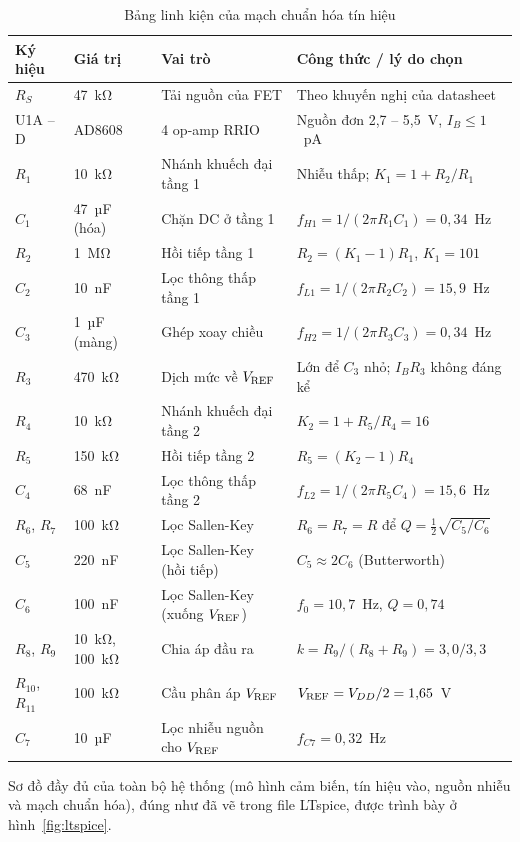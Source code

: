 \begin{table}[!htb]
\centering
\caption{Bảng linh kiện của mạch chuẩn hóa tín hiệu}
\label{tab:bom}
\small
\begin{tabularx}{\textwidth}{@{}p{1.3cm}p{1.7cm}p{3.8cm}L@{}}
\toprule
\textbf{Ký hiệu} & \textbf{Giá trị} & \textbf{Vai trò} & \textbf{Công thức / lý do chọn} \\ \midrule
$R_S$ & 47~kΩ & Tải nguồn của FET & Theo khuyến nghị của datasheet \\
U1A -- D & AD8608 & 4 op-amp RRIO & Nguồn đơn 2,7 -- 5,5~V, $I_B \le 1$~pA \\
$R_1$ & 10~kΩ & Nhánh khuếch đại tầng 1 & Nhiễu thấp; $K_1 = 1+R_2/R_1$ \\
$C_1$ & 47~µF (hóa) & Chặn DC ở tầng 1 & $f_{H1}=1/(2\pi R_1C_1)=0{,}34$~Hz \\
$R_2$ & 1~MΩ & Hồi tiếp tầng 1 & $R_2 = (K_1-1)R_1$, $K_1 = 101$ \\
$C_2$ & 10~nF & Lọc thông thấp tầng 1 & $f_{L1} = 1/(2\pi R_2C_2) = 15{,}9$~Hz \\
$C_3$ & 1~µF (màng) & Ghép xoay chiều & $f_{H2}=1/(2\pi R_3C_3)=0{,}34$~Hz \\
$R_3$ & 470~kΩ & Dịch mức về $V_\mathrm{REF}$ & Lớn để $C_3$ nhỏ; $I_BR_3$ không đáng kể \\
$R_4$ & 10~kΩ & Nhánh khuếch đại tầng 2 & $K_2 = 1+R_5/R_4 = 16$ \\
$R_5$ & 150~kΩ & Hồi tiếp tầng 2 & $R_5 = (K_2-1)R_4$ \\
$C_4$ & 68~nF & Lọc thông thấp tầng 2 & $f_{L2} = 1/(2\pi R_5C_4) = 15{,}6$~Hz \\
$R_6$, $R_7$ & 100~kΩ & Lọc Sallen-Key & $R_6=R_7=R$ để $Q = \frac12\sqrt{C_5/C_6}$ \\
$C_5$ & 220~nF & Lọc Sallen-Key (hồi tiếp) & $C_5 \approx 2C_6$ (Butterworth) \\
$C_6$ & 100~nF & Lọc Sallen-Key (xuống $V_\mathrm{REF}$) & $f_0 = 10{,}7$~Hz, $Q = 0{,}74$ \\
$R_8$, $R_9$ & 10~kΩ, 100~kΩ & Chia áp đầu ra & $k = R_9/(R_8+R_9) = 3{,}0/3{,}3$ \\
$R_{10}$, $R_{11}$ & 100~kΩ & Cầu phân áp $V_\mathrm{REF}$ & $V_\mathrm{REF} = V_{DD}/2 = 1{,}65$~V \\
$C_7$ & 10~µF & Lọc nhiễu nguồn cho $V_\mathrm{REF}$ & $f_{C7} = 0{,}32$~Hz \\
\bottomrule
\end{tabularx}
\end{table}

Sơ đồ đầy đủ của toàn bộ hệ thống (mô hình cảm biến, tín hiệu vào, nguồn nhiễu và mạch chuẩn hóa), đúng như đã vẽ trong file LTspice, được trình bày ở hình~\ref{fig:ltspice}.
